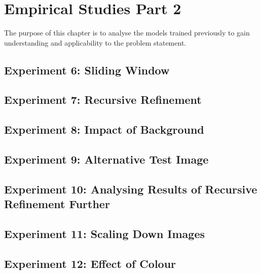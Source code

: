 \chapter{Empirical Studies Part 2}
The purpose of this chapter is to analyse the models trained previously to gain understanding and applicability to the problem statement.

\section{Experiment 6: Sliding Window}
\label{slidingWindow}


\section{Experiment 7: Recursive Refinement}
\label{RR}


\section{Experiment 8: Impact of Background}
\label{background}


\section{Experiment 9: Alternative Test Image}
\label{alternative}


\section{Experiment 10: Analysing Results of Recursive Refinement Further}
\label{rrAnalyse}


\section{Experiment 11: Scaling Down Images}
\label{scale}


\section{Experiment 12: Effect of Colour}
\label{colour}


